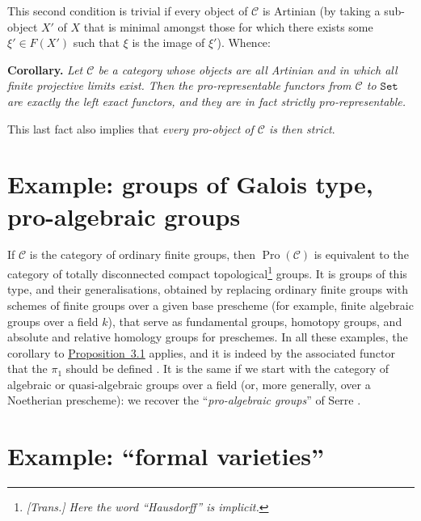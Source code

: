 \documentclass{article}
\newenvironment{itenv}[1]
  {\phantomsection\par\medskip\noindent\textbf{#1.}\itshape}
  {\medskip}
\renewcommand{\cal}[1]{{\mathcal{#1}}}
\newcommand{\Set}{\mathtt{Set}}
\DeclareMathOperator{\Pro}{Pro}
\begin{document}
This second condition is trivial if every object of $\cal{C}$ is Artinian (by taking a sub-object $X'$ of $X$ that is minimal amongst those for which there exists some $\xi'\in F(X')$ such that $\xi$ is the image of $\xi'$).
Whence:

\begin{itenv}{Corollary}
  Let $\cal{C}$ be a category whose objects are all Artinian and in which all finite projective limits exist.
  Then the pro-representable functors from $\cal{C}$ to $\Set$ are exactly the left exact functors, and they are in fact strictly pro-representable.
\end{itenv}

This last fact also implies that \emph{every pro-object of $\cal{C}$ is then strict}.


\section{Example: groups of Galois type, pro-algebraic groups}
\label{A.4}

If $\cal{C}$ is the category of ordinary finite groups, then $\Pro(\cal{C})$ is equivalent to the category of totally disconnected compact topological\footnote{\emph{[Trans.] Here the word ``Hausdorff'' is implicit.}} groups.
It is groups of this type, and their generalisations, obtained by replacing ordinary finite groups with schemes of finite groups over a given base prescheme (for example, finite algebraic groups over a field $k$), that serve as fundamental groups, homotopy groups, and absolute and relative homology groups for preschemes.
In all these examples, the corollary to \hyperref[A.3-proposition1]{Proposition~3.1} applies, and it is indeed by the associated functor that the $\pi_1$ should be defined \cite{2}.
It is the same if we start with the category of algebraic or quasi-algebraic groups over a field (or, more generally, over a Noetherian prescheme): we recover the ``\emph{pro-algebraic groups}'' of Serre \cite{4}.


\section{Example: ``formal varieties''}
\label{A.5}
\end{document}
